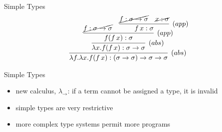 \documentclass{beamer}
\begin{document}
\begin{frame}{Simple Types}
\begin{align*}
\infer[(abs)]{\lambda f.\lambda x.f(f\,x):(\sigma\rightarrow\sigma)\rightarrow\sigma\rightarrow\sigma}{
  \infer[(abs)]{\lambda x.f(f\,x):\sigma\rightarrow\sigma}{
    \infer[(app)]{f(f\,x):\sigma}{\cancel{f:\sigma\rightarrow\sigma} &
      \infer[(app)]{f\,x:\sigma}{\cancel{f:\sigma\rightarrow\sigma} & \cancel{x:\sigma}}
    }
  }
}
\end{align*}
\end{frame}
\begin{frame}{Simple Types}
\begin{itemize}
\item new calculus, $\lambda_{\rightarrow}$: if a term cannot be assigned a type, it is invalid
\item simple types are very restrictive
\item more complex type systems permit more programs
\end{itemize}
\end{frame}
\end{document}
